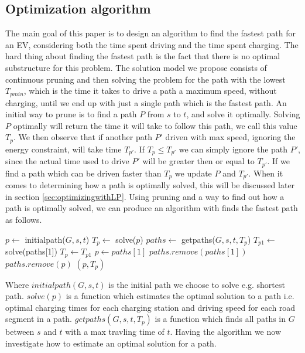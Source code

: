 \subsection{Optimization algorithm}
The main goal of this paper is to design an algorithm to find the fastest path for an EV, considering both the time spent driving and the time spent charging. The hard thing about finding the fastest path is the fact that there is no optimal substructure for this problem. The solution model we propose consists of continuous pruning and then solving the problem for the path with the lowest $T_{pmin}$, which is the time it takes to drive a path a maximum speed, without charging, until we end up with just a single path which is the fastest path. An initial way to prune is to find a path $P$ from $s$ to $t$, and solve it optimally. Solving $P$ optimally will return the time it will take to follow this path, we call this value $T_p$. We then observe that if another path $P'$ driven with max speed, ignoring the energy constraint, will take time $T_{p'}$. If $T_p \leq T_{p'}$ we can simply ignore the path $P'$, since the actual time used to drive $P'$ will be greater then or equal to $T_{p'}$. If we find a path which can be driven faster than $T_p$ we update $P$ and $T_{p'}$. When it comes to determining how a path is optimally solved, this will be discussed later in section \ref{sec:optimizingwithLP}. Using pruning and a way to find out how a path is optimally solved, we can produce an algorithm with finds the fastest path as follows. 

\begin{algorithmic}
    \State $p \gets$ initialpath($G,s,t$)
    \State $T_p \gets$ solve($p$)
    \State $paths \gets$ getpaths($G,s,t,T_p$)
    \Repeat 
    	\State $T_{p1} \gets$ solve(paths[1])
    		\State $T_p \gets T_{p1}$
    		\State $p \gets paths[1]$ 
    	\EndIf 
    	\State $paths.remove(paths[1])$
    			\State $paths.remove(p)$
    		\EndIf
    	\EndFor
    \State \Return $(p, T_p)$
\EndFunction
\end{algorithmic}

Where $initialpath(G,s,t)$ is the initial path we choose to solve e.g. shortest path. $solve(p)$ is a function which estimates the optimal solution to a path i.e. optimal charging times for each charging station and driving speed for each road segment in a path. $getpaths(G,s,t,T_p)$ is a function which finds all paths in $G$ between $s$ and $t$ with a max travling time of $t$. Having the algorithm we now investigate how to estimate an optimal solution for a path.     

